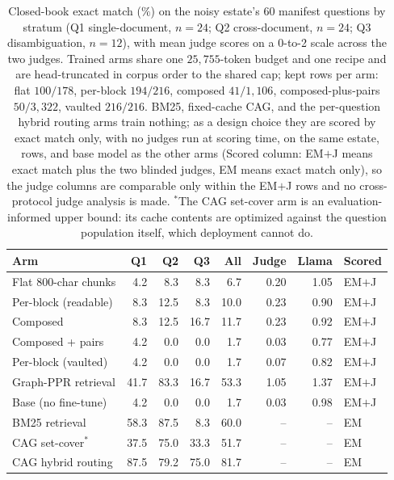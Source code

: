 \documentclass{article}
\begin{document}
\begin{table}[t]
\centering
\caption{Closed-book exact match ($\%$) on the noisy estate's 60 manifest questions by stratum (Q1 single-document, $n{=}24$; Q2 cross-document, $n{=}24$; Q3 disambiguation, $n{=}12$), with mean judge scores on a 0-to-2 scale across the two judges. Trained arms share one $25{,}755$-token budget and one recipe and are head-truncated in corpus order to the shared cap; kept rows per arm: flat $100/178$, per-block $194/216$, composed $41/1{,}106$, composed-plus-pairs $50/3{,}322$, vaulted $216/216$. BM25, fixed-cache CAG, and the per-question hybrid routing arms train nothing; as a design choice they are scored by exact match only, with no judges run at scoring time, on the same estate, rows, and base model as the other arms (Scored column: EM$+$J means exact match plus the two blinded judges, EM means exact match only), so the judge columns are comparable only within the EM$+$J rows and no cross-protocol judge analysis is made. $^{\ast}$The CAG set-cover arm is an evaluation-informed upper bound: its cache contents are optimized against the question population itself, which deployment cannot do.}
\label{tab:k3}
\scriptsize
\setlength{\tabcolsep}{3pt}
\begin{tabular}{lrrrrrrl}
\toprule
Arm & Q1 & Q2 & Q3 & All & Judge & Llama & Scored \\
\midrule
Flat 800-char chunks & 4.2 & 8.3 & 8.3 & 6.7 & 0.20 & 1.05 & EM$+$J \\
Per-block (readable) & 8.3 & 12.5 & 8.3 & 10.0 & 0.23 & 0.90 & EM$+$J \\
Composed & 8.3 & 12.5 & 16.7 & 11.7 & 0.23 & 0.92 & EM$+$J \\
Composed + pairs & 4.2 & 0.0 & 0.0 & 1.7 & 0.03 & 0.77 & EM$+$J \\
Per-block (vaulted) & 4.2 & 0.0 & 0.0 & 1.7 & 0.07 & 0.82 & EM$+$J \\
Graph-PPR retrieval & 41.7 & 83.3 & 16.7 & 53.3 & 1.05 & 1.37 & EM$+$J \\
Base (no fine-tune) & 4.2 & 0.0 & 0.0 & 1.7 & 0.03 & 0.98 & EM$+$J \\
BM25 retrieval & 58.3 & 87.5 & 8.3 & 60.0 & -- & -- & EM \\
CAG set-cover$^{\ast}$ & 37.5 & 75.0 & 33.3 & 51.7 & -- & -- & EM \\
CAG hybrid routing & 87.5 & 79.2 & 75.0 & 81.7 & -- & -- & EM \\
\bottomrule
\end{tabular}
\end{table}
\end{document}

